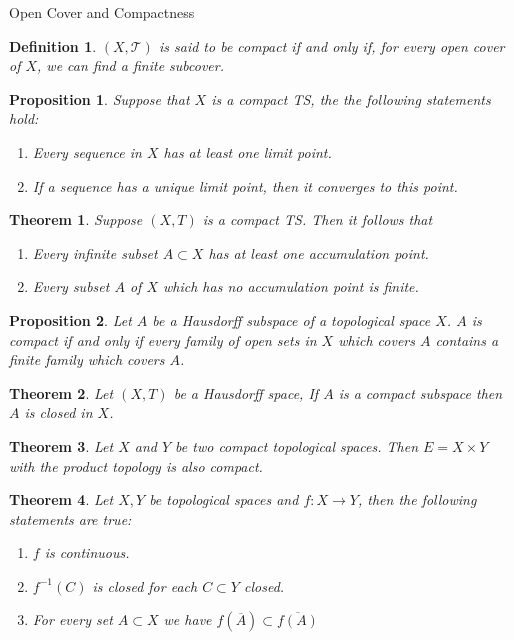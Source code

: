 \documentclass[12pt]{article}
\newtheorem{definition}{Definition}[section]
\newtheorem{proposition}{Proposition}[section]
\newtheorem{theorem}{Theorem}[section]
\begin{document}
\begin{section}{Open Cover and Compactness}
\begin{definition}
	$(X, \mathcal{T})$ is said to be compact if and only if, for every open cover of $X$, we can find a finite subcover.
\end{definition}

\begin{proposition}
	Suppose that $X$ is a compact TS, the the following statements hold:
	\begin{enumerate}
		\item Every sequence in $X$ has at least one limit point.
		\item If a sequence has a unique limit point, then it converges to this point.
	\end{enumerate}
\end{proposition}

\begin{theorem}
	Suppose $(X, T)$ is a compact TS. Then it follows that 
	\begin{enumerate}
		\item Every infinite subset $A\subset X$ has at least one accumulation point.
		\item Every subset $A$ of $X$ which has no accumulation point is finite.
	\end{enumerate}
\end{theorem}

\begin{proposition}
	Let $A$ be a Hausdorff subspace of a topological space $X$. $A$ is compact if and only if every family of open sets in $X$ which covers $A$ contains a finite family which covers $A$.
\end{proposition}

\begin{theorem}
	Let $(X, T)$ be a Hausdorff space, If $A$ is a compact subspace then $A$ is closed in $X$.
\end{theorem}

\begin{theorem}
	Let $X$ and $Y$ be two compact topological spaces. Then $E = X\times Y$ with the product topology is also compact.
\end{theorem}

\begin{theorem}
	Let $X, Y$ be topological spaces and $f:X\rightarrow Y$, then the following statements are true:
	\begin{enumerate}
		\item $f$ is continuous.
		\item $f^{-1}(C)$ is closed for each $C\subset Y$ closed.
		\item For every set  $A\subset X$ we have $f(\overline{A})\subset\overline{f(A)}$
	\end{enumerate}
\end{theorem}


\end{section}
\end{document}
